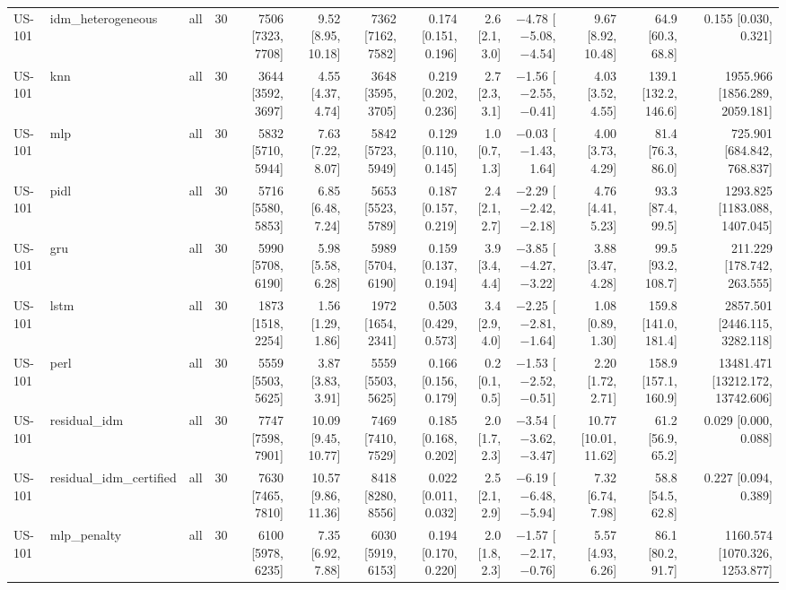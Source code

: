 \begin{table}[htbp]
{\begin{tabular}{lllrrrrrrrrrr}
US-101 & idm\_heterogeneous & all & 30 & 7506 [7323, 7708] & 9.52 [8.95, 10.18] & 7362 [7162, 7582] & 0.174 [0.151, 0.196] & 2.6 [2.1, 3.0] & $-$4.78 [$-$5.08, $-$4.54] & 9.67 [8.92, 10.48] & 64.9 [60.3, 68.8] & 0.155 [0.030, 0.321] \\
US-101 & knn & all & 30 & 3644 [3592, 3697] & 4.55 [4.37, 4.74] & 3648 [3595, 3705] & 0.219 [0.202, 0.236] & 2.7 [2.3, 3.1] & $-$1.56 [$-$2.55, $-$0.41] & 4.03 [3.52, 4.55] & 139.1 [132.2, 146.6] & 1955.966 [1856.289, 2059.181] \\
US-101 & mlp & all & 30 & 5832 [5710, 5944] & 7.63 [7.22, 8.07] & 5842 [5723, 5949] & 0.129 [0.110, 0.145] & 1.0 [0.7, 1.3] & $-$0.03 [$-$1.43, 1.64] & 4.00 [3.73, 4.29] & 81.4 [76.3, 86.0] & 725.901 [684.842, 768.837] \\
US-101 & pidl & all & 30 & 5716 [5580, 5853] & 6.85 [6.48, 7.24] & 5653 [5523, 5789] & 0.187 [0.157, 0.219] & 2.4 [2.1, 2.7] & $-$2.29 [$-$2.42, $-$2.18] & 4.76 [4.41, 5.23] & 93.3 [87.4, 99.5] & 1293.825 [1183.088, 1407.045] \\
US-101 & gru & all & 30 & 5990 [5708, 6190] & 5.98 [5.58, 6.28] & 5989 [5704, 6190] & 0.159 [0.137, 0.194] & 3.9 [3.4, 4.4] & $-$3.85 [$-$4.27, $-$3.22] & 3.88 [3.47, 4.28] & 99.5 [93.2, 108.7] & 211.229 [178.742, 263.555] \\
US-101 & lstm & all & 30 & 1873 [1518, 2254] & 1.56 [1.29, 1.86] & 1972 [1654, 2341] & 0.503 [0.429, 0.573] & 3.4 [2.9, 4.0] & $-$2.25 [$-$2.81, $-$1.64] & 1.08 [0.89, 1.30] & 159.8 [141.0, 181.4] & 2857.501 [2446.115, 3282.118] \\
US-101 & perl & all & 30 & 5559 [5503, 5625] & 3.87 [3.83, 3.91] & 5559 [5503, 5625] & 0.166 [0.156, 0.179] & 0.2 [0.1, 0.5] & $-$1.53 [$-$2.52, $-$0.51] & 2.20 [1.72, 2.71] & 158.9 [157.1, 160.9] & 13481.471 [13212.172, 13742.606] \\
US-101 & residual\_idm & all & 30 & 7747 [7598, 7901] & 10.09 [9.45, 10.77] & 7469 [7410, 7529] & 0.185 [0.168, 0.202] & 2.0 [1.7, 2.3] & $-$3.54 [$-$3.62, $-$3.47] & 10.77 [10.01, 11.62] & 61.2 [56.9, 65.2] & 0.029 [0.000, 0.088] \\
US-101 & residual\_idm\_certified & all & 30 & 7630 [7465, 7810] & 10.57 [9.86, 11.36] & 8418 [8280, 8556] & 0.022 [0.011, 0.032] & 2.5 [2.1, 2.9] & $-$6.19 [$-$6.48, $-$5.94] & 7.32 [6.74, 7.98] & 58.8 [54.5, 62.8] & 0.227 [0.094, 0.389] \\
US-101 & mlp\_penalty & all & 30 & 6100 [5978, 6235] & 7.35 [6.92, 7.88] & 6030 [5919, 6153] & 0.194 [0.170, 0.220] & 2.0 [1.8, 2.3] & $-$1.57 [$-$2.17, $-$0.76] & 5.57 [4.93, 6.26] & 86.1 [80.2, 91.7] & 1160.574 [1070.326, 1253.877] \\

\end{tabular}}
\end{table}
